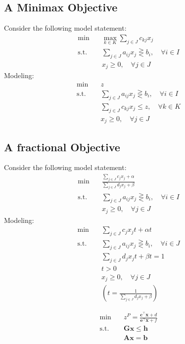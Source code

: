 			\subsection{A Minimax Objective}
				Consider the following model statement:
				\begin{align}
					\min \quad & \max_{k\in K}\sum_{j\in J}c_{kj}x_j \\
					\text{s.t.} \quad & \sum_{j\in J}a_{ij}x_j \gtreqless b_i, \quad \forall i\in I \\
					                  & x_j \ge 0, \quad \forall j\in J 
				\end{align}
				Modeling:
				\begin{align}
					\min \quad & z \\
					\text{s.t.} \quad & \sum_{j\in J}a_{ij}x_j \gtreqless b_i, \quad \forall i\in I \\
									  & \sum_{j\in J}c_{kj}x_j \le z, \quad \forall k\in K \\
					                  & x_j \ge 0, \quad \forall j\in J 
				\end{align}
			\subsection{A fractional Objective}
				Consider the following model statement:
				\begin{align}
					\min \quad & \frac{\sum_{j\in J}c_{j}x_j + \alpha}{\sum_{j\in J}d_{j}x_j + \beta} \\
					\text{s.t.} \quad & \sum_{j\in J}a_{ij}x_j \gtreqless b_i, \quad \forall i\in I \\
					                  & x_j \ge 0, \quad \forall j\in J 
				\end{align}
				Modeling:
				\begin{align}
					\min \quad & \sum_{j\in J}c_{j}x_jt + \alpha t \\
					\text{s.t.} \quad & \sum_{j\in J}a_{ij}x_j \gtreqless b_i, \quad \forall i\in J \\
									  & \sum_{j\in J}d_jx_jt + \beta t = 1\\
									  & t > 0 \\
					                  & x_j \ge 0, \quad \forall j\in J \\
					                  & (t = \frac1{\sum_{j\in J}d_jx_j + \beta}) 
				\end{align}

				\begin{align}
					\min \quad & z^P = \frac{\mathbf{c^\top x} + d}{\mathbf{e^\top x} + f}\\
					\text{s.t.} \quad & \mathbf{Gx} \le \mathbf{h}\\
					                  & \mathbf{Ax} = \mathbf{b}
				\end{align}

